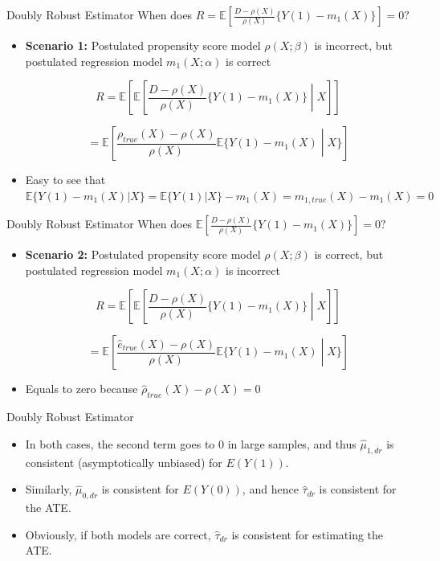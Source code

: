 \documentclass{beamer}
\begin{document}
\begin{frame}{Doubly Robust Estimator}
    When does \( R = \mathbb{E} \left[ \frac{D - \rho(X)}{\rho(X)} \{Y(1) - m_1(X)\} \right] = 0? \)

    \begin{itemize}
        \item \textbf{Scenario 1:} Postulated propensity score model \( \rho(X; \beta) \) is
        incorrect, but postulated regression model \( m_1(X; \alpha) \) is correct

        \[
        R = \mathbb{E} \left[ \mathbb{E} \left[ \frac{D - \rho(X)}{\rho(X)} \{Y(1) - m_1(X)\} \middle| X \right] \right]
        \]

        \[
        = \mathbb{E} \left[ \frac{\rho_{true}(X) - \rho(X)}{\rho(X)} \mathbb{E} \{Y(1) - m_1(X) \middle| X\} \right]
        \]

\item Easy to see that \( \mathbb{E} \{Y(1) - m_1(X) | X\} = \mathbb{E} \{Y(1) | X\} - m_1(X) = m_{1,true}(X) - m_1(X) = 0 \)

    \end{itemize}
\end{frame}


\begin{frame}{Doubly Robust Estimator}
    When does \( \mathbb{E} \left[ \frac{D - \rho(X)}{\rho(X)} \{Y(1) - m_1(X)\} \right] = 0? \)

    \begin{itemize}
        \item \textbf{Scenario 2:} Postulated propensity score model \( \rho(X; \beta) \) is correct,
        but postulated regression model \( m_1(X; \alpha) \) is incorrect

        \[
        R = \mathbb{E} \left[ \mathbb{E} \left[ \frac{D - \rho(X)}{\rho(X)} \{Y(1) - m_1(X)\} \middle| X \right] \right]
        \]

        \[
        = \mathbb{E} \left[ \frac{\hat{e}_{true}(X) - \rho(X)}{\rho(X)} \mathbb{E} \{Y(1) - m_1(X) \middle| X\} \right]
        \]

        \item Equals to zero because \( \hat{\rho}_{true}(X) - \rho(X) = 0 \)
    \end{itemize}
\end{frame}




\begin{frame}{Doubly Robust Estimator}
    \begin{itemize}
        \item In both cases, the second term goes to 0 in large samples, and
        thus \( \hat{\mu}_{1,dr} \) is consistent (asymptotically unbiased) for \( E(Y(1)) \).
        \item Similarly, \( \hat{\mu}_{0,dr} \) is consistent for \( E(Y(0)) \), and hence \( \hat{\tau}_{dr} \)
        is consistent for the ATE.
        \item Obviously, if both models are correct, \( \hat{\tau}_{dr} \) is consistent for
        estimating the ATE.
    \end{itemize}
\end{frame}
\end{document}

